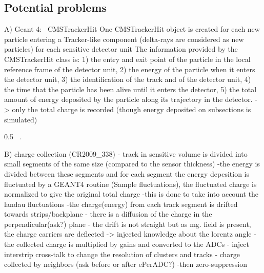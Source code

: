 \subsection{Potential problems}
A) Geant 4:~\cite{Lefebure:1364020}
CMSTrackerHit
One CMSTrackerHit object is created
for each new particle entering a Tracker-like component (delta-rays are considered as new particles)
for each sensitive detector unit
The information provided by the CMSTrackerHit class is:
1) the entry and exit point of the particle in the local reference frame of the detector unit,
2) the energy of the particle when it enters the detector unit,
3) the identification of the track and of the detector unit,
4) the time that the particle has been alive until it enters the detector,
5) the total amount of energy deposited by the particle along its trajectory in the detector.
-> only the total charge is recorded  (though energy deposited on subsections is simulated)

                 {0.5}       %
                 { ~\cite{website:simuBasics}. }


B) charge collection (CR2009\_338)
- track in sensitive volume is divided into small segments of the same size (compared to the sensor thickness)
-the energy is divided between these segments and for each segment the energy depesition is fluctuated by a GEANT4 routine (Sample fluctuations), the fluctuated charge is normalized to give the original total charge
-this is done to take into account the landau fluctuations
-the charge(energy) from each track segment is drifted towards strips/backplane
- there is a diffusion of the charge in the perpendicular(ask?) plane
- the drift is not straight but as mg. field is present, the charge carriers are deflected -> injected knowledge about the lorentz angle
- the collected charge is multiplied by gains and converted to the ADCs
- inject interstrip cross-talk to change the resolution of clusters and tracks - charge collected by neighbors (ask before or after ePerADC?)
-then zero-suppression

